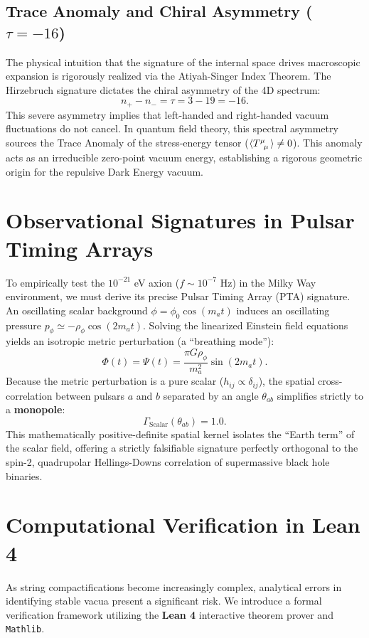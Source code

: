 \documentclass[11pt,a4paper]{article}
\begin{document}
\subsection{Trace Anomaly and Chiral Asymmetry ($\tau = -16$)}
The physical intuition that the signature of the internal space drives macroscopic expansion is rigorously realized via the Atiyah-Singer Index Theorem. The Hirzebruch signature dictates the chiral asymmetry of the 4D spectrum:
\begin{equation}
    n_+ - n_- = \tau = 3 - 19 = -16.
\end{equation}
This severe asymmetry implies that left-handed and right-handed vacuum fluctuations do not cancel. In quantum field theory, this spectral asymmetry sources the Trace Anomaly of the stress-energy tensor ($\langle \tensor{T}{^\mu_\mu} \rangle \neq 0$). This anomaly acts as an irreducible zero-point vacuum energy, establishing a rigorous geometric origin for the repulsive Dark Energy vacuum.

\section{Observational Signatures in Pulsar Timing Arrays}
To empirically test the $10^{-21}$ eV axion ($f \sim 10^{-7}$ Hz) in the Milky Way environment, we must derive its precise Pulsar Timing Array (PTA) signature. An oscillating scalar background $\phi = \phi_0 \cos(m_a t)$ induces an oscillating pressure $p_\phi \simeq -\rho_\phi \cos(2m_a t)$. Solving the linearized Einstein field equations yields an isotropic metric perturbation (a ``breathing mode''):
\begin{equation}
    \Phi(t) = \Psi(t) = \frac{\pi G \rho_\phi}{m_a^2} \sin(2m_a t).
\end{equation}
Because the metric perturbation is a pure scalar ($h_{ij} \propto \delta_{ij}$), the spatial cross-correlation between pulsars $a$ and $b$ separated by an angle $\theta_{ab}$ simplifies strictly to a \textbf{monopole}:
\begin{equation}
    \Gamma_{\text{Scalar}}(\theta_{ab}) = 1.0.
\end{equation}
This mathematically positive-definite spatial kernel isolates the ``Earth term'' of the scalar field, offering a strictly falsifiable signature perfectly orthogonal to the spin-2, quadrupolar Hellings-Downs correlation of supermassive black hole binaries.

\section{Computational Verification in Lean 4}
As string compactifications become increasingly complex, analytical errors in identifying stable vacua present a significant risk. We introduce a formal verification framework utilizing the \textbf{Lean 4} interactive theorem prover and \texttt{Mathlib}.
\end{document}
